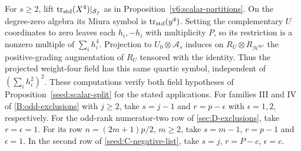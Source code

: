 \documentclass[11pt,a4paper]{amsart}
\numberwithin{equation}{section}
\theoremstyle{definition}
\theoremstyle{remark}
\begin{document}
For $s\ge2$, lift $\operatorname{tr}_{\rm std}(X^4)|_{\mathcal S_f}$
as in Proposition~\ref{v6:scalar-partitions}. On the degree-zero
algebra its Miura symbol is $\operatorname{tr}_{\rm std}(y^4)$.
Setting the complementary $U$ coordinates to zero leaves each
$h_i,-h_i$ with multiplicity $P$, so its restriction is a nonzero
multiple of $\sum_i h_i^4$. Projection to $U_0\otimes\mathcal A_s$
induces on $R_U\otimes R_{\mathcal H^{\otimes s}}$ the positive-grading augmentation
of $R_U$ tensored with the identity. Thus the projected weight-four
field has this same quartic symbol, independent of
$(\sum_i h_i^2)^2$. These computations verify both field hypotheses
of Proposition~\ref{seed:scalar-split} for the stated applications.
For families III and IV of \cref{B:odd-exclusions} with $j\ge2$, take
$s=j-1$ and $r=p-\epsilon$ with $\epsilon=1,2$, respectively.
For the odd-rank numerator-two row of \cref{sec:D-exclusions},
take $r=\epsilon=1$. For its row $n=(2m+1)p/2$, $m\ge2$,
take $s=m-1$, $r=p-1$ and $\epsilon=1$. In the second row of
\eqref{seed:C-negative-list}, take $s=j$, $r=P-c$, $\epsilon=c$.
\end{document}
